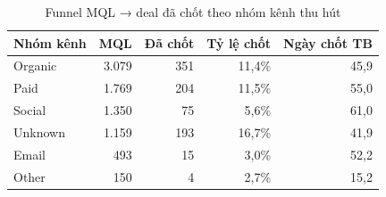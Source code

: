 \begin{table}[htbp]
\centering\small
\caption{Funnel MQL → deal đã chốt theo nhóm kênh thu hút}
\label{tab:funnel-channel}
\begin{tabular}{lrrrr}
\toprule
\textbf{Nhóm kênh} & \textbf{MQL} & \textbf{Đã chốt} & \textbf{Tỷ lệ chốt} & \textbf{Ngày chốt TB} \\
\midrule
Organic & 3.079 & 351 & 11,4\% & 45,9 \\
Paid & 1.769 & 204 & 11,5\% & 55,0 \\
Social & 1.350 & 75 & 5,6\% & 61,0 \\
Unknown & 1.159 & 193 & 16,7\% & 41,9 \\
Email & 493 & 15 & 3,0\% & 52,2 \\
Other & 150 & 4 & 2,7\% & 15,2 \\
\bottomrule
\end{tabular}
\end{table}

